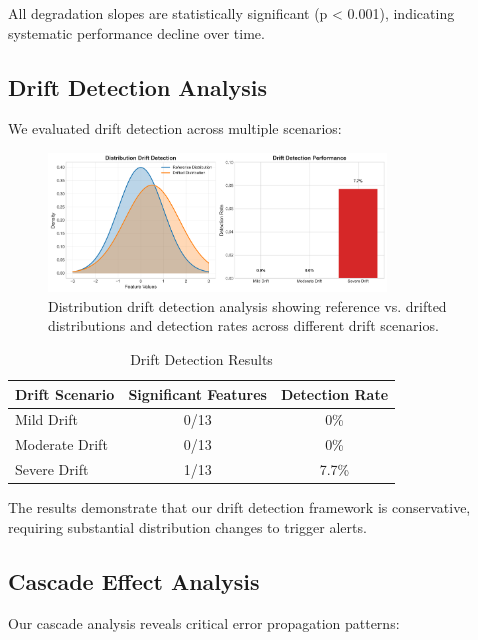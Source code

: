 \documentclass{article}
\begin{document}
All degradation slopes are statistically significant (p < 0.001), indicating systematic performance decline over time.

\subsection{Drift Detection Analysis}

We evaluated drift detection across multiple scenarios:

\begin{figure}[h]
\centering
\includegraphics[width=0.8\textwidth]{media/drift_detection.png}
\caption{Distribution drift detection analysis showing reference vs. drifted distributions and detection rates across different drift scenarios.}
\label{fig:drift_detection}
\end{figure}

\begin{table}[h]
\centering
\caption{Drift Detection Results}
\begin{tabular}{lcc}
\toprule
\textbf{Drift Scenario} & \textbf{Significant Features} & \textbf{Detection Rate} \\
\midrule
Mild Drift & 0/13 & 0\% \\
Moderate Drift & 0/13 & 0\% \\
Severe Drift & 1/13 & 7.7\% \\
\bottomrule
\end{tabular}
\end{table}

The results demonstrate that our drift detection framework is conservative, requiring substantial distribution changes to trigger alerts.

\subsection{Cascade Effect Analysis}

Our cascade analysis reveals critical error propagation patterns:
\end{document}
